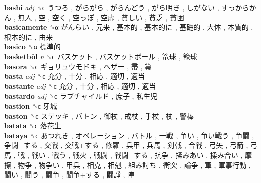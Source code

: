 \textbf{bashí} \emph{adj}  ␝ϲ   うつろ ,  がらがら ,  がらんどう ,  がら明き ,  しがない ,  すっからかん ,  無人 ,  空 ,  空く ,  空っぽ ,  空虚 ,  貧しい ,  貧乏 ,  貧困   \\
\textbf{basicamente} ␝α   がんらい ,  元来 ,  基本的 ,  基本的に ,  基礎的 ,  大体 ,  本質的 ,  根本的に ,  由来   \\
\textbf{basico} ␝α   標準的   \\
\textbf{basketbòl} \emph{n}  ␝ϲ   バスケット ,  バスケットボール ,  篭球 ,  籠球   \\
\textbf{basora} ␝ϲ   ギョリュウモドキ ,  ヘザー ,  帚 ,  箒   \\
\textbf{basta} \emph{adj}  ␝ϲ   充分 ,  十分 ,  相応 ,  適切 ,  適当   \\
\textbf{bastante} \emph{adj}  ␝ϲ   充分 ,  十分 ,  相応 ,  適切 ,  適当   \\
\textbf{bastardo} \emph{adj}  ␝ϲ   ラブチャイルド ,  庶子 ,  私生児   \\
\textbf{bastion} ␝ϲ   牙城   \\
\textbf{baston} ␝ϲ   ステッキ ,  バトン ,  御杖 ,  戒杖 ,  手杖 ,  杖 ,  警棒   \\
\textbf{batata} ␝ϲ   落花生   \\
\textbf{bataya} ␝ϲ   あつれき ,  オペレーション ,  バトル ,  一戦 ,  争い ,  争い戦う ,  争闘 ,  争闘+する ,  交戦 ,  交戦+する ,  修羅 ,  兵甲 ,  兵馬 ,  剣戟 ,  合戦 ,  弓矢 ,  弓箭 ,  弓馬 ,  戦 ,  戦い ,  戦う ,  戦火 ,  戦闘 ,  戦闘+する ,  抗争 ,  揉みあい ,  揉み合い ,  摩擦 ,  物争 ,  物争い ,  甲兵 ,  相克 ,  相剋 ,  組み討ち ,  衝突 ,  論争 ,  軍 ,  軍事行動 ,  闘い ,  闘う ,  闘争 ,  闘争+する ,  闘諍 ,  陣   \\
